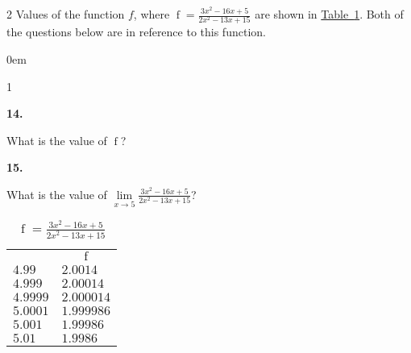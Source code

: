 \documentclass[12pt,]{book}
\theoremstyle{plain}
\theoremstyle{definition}
\numberwithin{equation}{section}
\newcommand{\hrulemedium}{\noalign{\hrule height 0.07em}}
\newcommand{\hrulethick} {\noalign{\hrule height 0.11em}}
\newenvironment{exercisegroup}%
{\medskip\noindent}%
{\par\bigskip}%
\newlength{\exercisegroupindent}%
\newlength{\exercisegroupitemwidth}%
\newenvironment{exercisegrouplist}%
{\vspace{-\partopsep}%
\begin{adjustwidth}{\exercisegroupindent}{0em}}%
{\end{adjustwidth}%
\vspace{-\partopsep}%
\vspace{\baselineskip}}%
\newenvironment{exercisegroupbycol}[1]%
{\begin{exercisegrouplist}%
\vspace{-\multicolsep}%
\begin{multicols}{#1}%
\setlength{\parindent}{0em}%
\setlength{\exercisegroupitemwidth}{\linewidth}}%
{\end{multicols}%
\vspace{-\multicolsep}%
\end{exercisegrouplist}}%
\newenvironment{exercisegroupitem}[1]%
{\begin{minipage}[t]{\exercisegroupitemwidth}
\vspace{0pt}%
{\bfseries#1}%
\rule{0pt}{\baselineskip}}{\strut%
\end{minipage}%
\hspace{\columnsep}}%
\providecommand\phantomsection{}
\newcommand{\fe}[2]{\mathop{{#1}{\left(#2\right)}}}
\begin{document}
\begin{multicols}{2}
\begin{exercisegroup}%
Values of the function \(f\), where \(\fe{f}{x}=\frac{3x^2-16x+5}{2x^2-13x+15}\) are shown in \hyperref[table-rational-function-values]{Table~\ref*{table-rational-function-values}}. Both of the questions below are in reference to this function.%
\par
\begin{exercisegroupbycol}{1}%
\begin{exercisegroupitem}{14. }\phantomsection\hypertarget{exercise-59}{\null}
What is the value of \(\fe{f}{5}\)?%
\end{exercisegroupitem}%
\par%
\begin{exercisegroupitem}{15. }\phantomsection\hypertarget{exercise-60}{\null}
What is the value of \(\lim\limits_{x\to5}\frac{3x^2-16x+5}{2x^2-13x+15}\)?%
\end{exercisegroupitem}%
\par%
\end{exercisegroupbycol}%
\end{exercisegroup}%
\vfill
\columnbreak
\begin{table}
\centering
\caption{\(\fe{f}{x}=\frac{3x^2-16x+5}{2x^2-13x+15}\)\label{table-rational-function-values}}
\begin{tabular}{ll}\hrulethick
\multicolumn{1}{c}{\(x\)}&\multicolumn{1}{c}{\(\fe{f}{x}\)}\\\hrulemedium
\(4.99\)&\(2.0014\)\\
\(4.999\)&\(2.00014\)\\
\(4.9999\)&\(2.000014\)\\
\(5.0001\)&\(1.999986\)\\
\(5.001\)&\(1.99986\)\\
\(5.01\)&\(1.9986\)
\end{tabular}
\end{table}
\end{multicols}%
\end{document}
